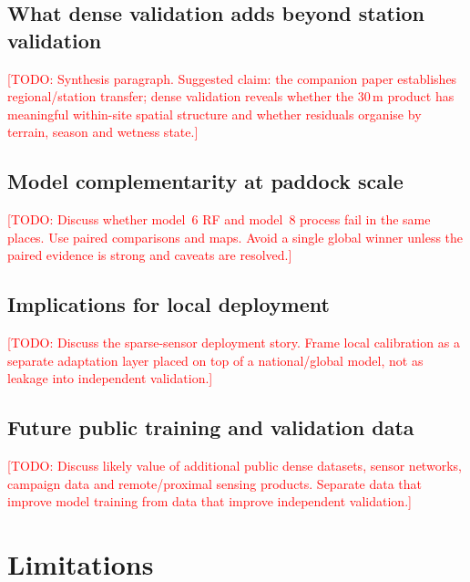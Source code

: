 \documentclass[11pt,a4paper]{article}
\newcommand{\modelSix}{model~6 RF}
\newcommand{\modelEight}{model~8 process}
\newcommand{\todo}[1]{\textcolor{red}{[TODO: #1]}}
\begin{document}
\subsection{What dense validation adds beyond station validation}
\label{sec:dense-adds}

\todo{Synthesis paragraph.  Suggested claim: the companion paper establishes
regional/station transfer; dense validation reveals whether the 30\,m product
has meaningful within-site spatial structure and whether residuals organise by
terrain, season and wetness state.}

\subsection{Model complementarity at paddock scale}
\label{sec:model-complementarity}

\todo{Discuss whether \modelSix{} and \modelEight{} fail in the same places.
Use paired comparisons and maps.  Avoid a single global winner unless the
paired evidence is strong and caveats are resolved.}

\subsection{Implications for local deployment}
\label{sec:deployment}

\todo{Discuss the sparse-sensor deployment story.  Frame local calibration as a
separate adaptation layer placed on top of a national/global model, not as
leakage into independent validation.}

\subsection{Future public training and validation data}
\label{sec:future-data}

\todo{Discuss likely value of additional public dense datasets, sensor
networks, campaign data and remote/proximal sensing products.  Separate data
that improve model training from data that improve independent validation.}

\section{Limitations}\label{sec:limitations}
\end{document}
